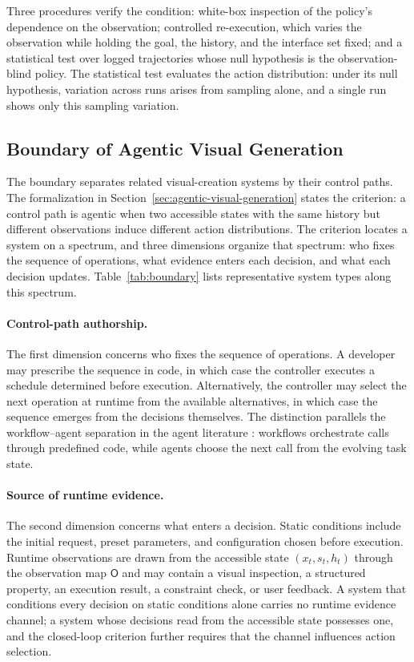 Three procedures verify the condition: white-box inspection of the policy's dependence on the observation; controlled re-execution, which varies the observation while holding the goal, the history, and the interface set fixed; and a statistical test over logged trajectories whose null hypothesis is the observation-blind policy. The statistical test evaluates the action distribution: under its null hypothesis, variation across runs arises from sampling alone, and a single run shows only this sampling variation.


\subsection{Boundary of Agentic Visual Generation}
\label{sec:agentic-visual-generation-boundary}

The boundary separates related visual-creation systems by their control paths. The formalization in Section~\ref{sec:agentic-visual-generation} states the criterion: a control path is agentic when two accessible states with the same history but different observations induce different action distributions. The criterion locates a system on a spectrum, and three dimensions organize that spectrum: who fixes the sequence of operations, what evidence enters each decision, and what each decision updates. Table~\ref{tab:boundary} lists representative system types along this spectrum.

\paragraph{Control-path authorship.}
The first dimension concerns who fixes the sequence of operations. A developer may prescribe the sequence in code, in which case the controller executes a schedule determined before execution. Alternatively, the controller may select the next operation at runtime from the available alternatives, in which case the sequence emerges from the decisions themselves. The distinction parallels the workflow--agent separation in the agent literature \cite{xie2024large,durante2024agentai}: workflows orchestrate calls through predefined code, while agents choose the next call from the evolving task state.

\paragraph{Source of runtime evidence.}
The second dimension concerns what enters a decision. Static conditions include the initial request, preset parameters, and configuration chosen before execution. Runtime observations are drawn from the accessible state $(x_t,s_t,h_t)$ through the observation map $\mathsf{O}$ and may contain a visual inspection, a structured property, an execution result, a constraint check, or user feedback. A system that conditions every decision on static conditions alone carries no runtime evidence channel; a system whose decisions read from the accessible state possesses one, and the closed-loop criterion further requires that the channel influences action selection.


